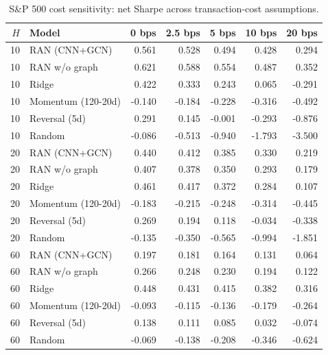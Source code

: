 \documentclass[10pt]{article}
\begin{document}
\begin{table}[tbp]
\centering\scriptsize
\caption{S\&P 500 cost sensitivity: net Sharpe across transaction-cost assumptions.}
\label{tab:sp500cost}
\begin{tabular}{r lrrrrr}
\toprule
$H$ & Model & 0 bps & 2.5 bps & 5 bps & 10 bps & 20 bps\\
\midrule
10 & RAN (CNN+GCN) & 0.561 & 0.528 & 0.494 & 0.428 & 0.294 \\
10 & RAN w/o graph & 0.621 & 0.588 & 0.554 & 0.487 & 0.352 \\
10 & Ridge & 0.422 & 0.333 & 0.243 & 0.065 & -0.291 \\
10 & Momentum (120-20d) & -0.140 & -0.184 & -0.228 & -0.316 & -0.492 \\
10 & Reversal (5d) & 0.291 & 0.145 & -0.001 & -0.293 & -0.876 \\
10 & Random & -0.086 & -0.513 & -0.940 & -1.793 & -3.500 \\
20 & RAN (CNN+GCN) & 0.440 & 0.412 & 0.385 & 0.330 & 0.219 \\
20 & RAN w/o graph & 0.407 & 0.378 & 0.350 & 0.293 & 0.179 \\
20 & Ridge & 0.461 & 0.417 & 0.372 & 0.284 & 0.107 \\
20 & Momentum (120-20d) & -0.183 & -0.215 & -0.248 & -0.314 & -0.445 \\
20 & Reversal (5d) & 0.269 & 0.194 & 0.118 & -0.034 & -0.338 \\
20 & Random & -0.135 & -0.350 & -0.565 & -0.994 & -1.851 \\
60 & RAN (CNN+GCN) & 0.197 & 0.181 & 0.164 & 0.131 & 0.064 \\
60 & RAN w/o graph & 0.266 & 0.248 & 0.230 & 0.194 & 0.122 \\
60 & Ridge & 0.448 & 0.431 & 0.415 & 0.382 & 0.316 \\
60 & Momentum (120-20d) & -0.093 & -0.115 & -0.136 & -0.179 & -0.264 \\
60 & Reversal (5d) & 0.138 & 0.111 & 0.085 & 0.032 & -0.074 \\
60 & Random & -0.069 & -0.138 & -0.208 & -0.346 & -0.624 \\
\bottomrule
\end{tabular}
\end{table}
\end{document}
